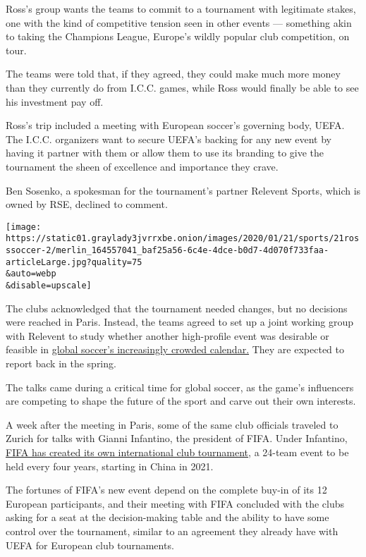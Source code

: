 Ross's group wants the teams to commit to a tournament with legitimate
stakes, one with the kind of competitive tension seen in other events
--- something akin to taking the Champions League, Europe's wildly
popular club competition, on tour.

The teams were told that, if they agreed, they could make much more
money than they currently do from I.C.C. games, while Ross would finally
be able to see his investment pay off.

Ross's trip included a meeting with European soccer's governing body,
UEFA. The I.C.C. organizers want to secure UEFA's backing for any new
event by having it partner with them or allow them to use its branding
to give the tournament the sheen of excellence and importance they
crave.

Ben Sosenko, a spokesman for the tournament's partner Relevent Sports,
which is owned by RSE, declined to comment.

\texttt{[image: https://static01.graylady3jvrrxbe.onion/images/2020/01/21/sports/21rosssoccer-2/merlin\_164557041\_baf25a56-6c4e-4dce-b0d7-4d070f733faa-articleLarge.jpg?quality=75\\\&auto=webp\\\&disable=upscale]}

The clubs acknowledged that the tournament needed changes, but no
decisions were reached in Paris. Instead, the teams agreed to set up a
joint working group with Relevent to study whether another high-profile
event was desirable or feasible in
\href{https://www.nytimes3xbfgragh.onion/2019/06/14/sports/copa-america-brazil.html}{global
soccer's increasingly crowded calendar.} They are expected to report
back in the spring.

The talks came during a critical time for global soccer, as the game's
influencers are competing to shape the future of the sport and carve out
their own interests.

A week after the meeting in Paris, some of the same club officials
traveled to Zurich for talks with Gianni Infantino, the president of
FIFA. Under Infantino,
\href{https://www.nytimes3xbfgragh.onion/2019/03/15/sports/fifa-2022-world-cup.html}{FIFA
has created its own international club tournament}, a 24-team event to
be held every four years, starting in China in 2021.

The fortunes of FIFA's new event depend on the complete buy-in of its 12
European participants, and their meeting with FIFA concluded with the
clubs asking for a seat at the decision-making table and the ability to
have some control over the tournament, similar to an agreement they
already have with UEFA for European club tournaments.

